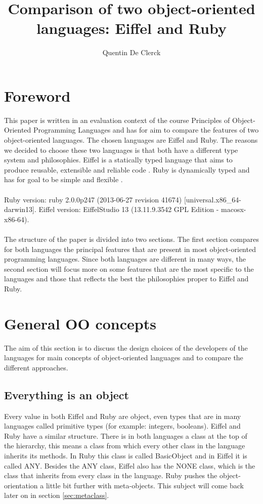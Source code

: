 \documentclass[12pt,a4paper,twocolumn]{article}
\title{Comparison of two object-oriented languages: Eiffel and Ruby}
\author{Quentin De Clerck}
\begin{document}
\maketitle
\tableofcontents
\section{Foreword}
This paper is written in an evaluation context of the course Principles of Object-Oriented Programming Languages and has for aim to compare the features of two object-oriented languages. The chosen languages are Eiffel and Ruby. The reasons we decided to choose these two languages is that both have a different type system and philosophies. Eiffel is a statically typed language that aims to produce reusable, extensible and reliable code \cite{meyer2001eiffel}. Ruby is dynamically typed and has for goal to be simple and flexible \cite{rubyAbout}. 
\\
\\
Ruby version: ruby 2.0.0p247 (2013-06-27 revision 41674) [universal.x86\_64-darwin13].
Eiffel version:  EiffelStudio 13 (13.11.9.3542 GPL Edition - macosx-x86-64).
\\
\\
The structure of the paper is divided into two sections. The first section compares for both languages the principal features that are present in most object-oriented programming languages. Since both languages are different in many ways, the second section will focus more on some features that are the most specific to the languages and those that reflects the best the philosophies proper to Eiffel and Ruby. 
\section{General OO concepts}
The aim of this section is to discuss the design choices of the developers of the languages for main concepts of object-oriented languages and to compare the different approaches. 
\subsection{Everything is an object}
Every value in both Eiffel and Ruby are object, even types that are in many languages called primitive types (for example: integers, booleans). Eiffel and Ruby have a similar structure. There is in both languages a class at the top of the hierarchy, this means a class from which every other class in the language inherits its methods. In Ruby this class is called BasicObject\cite{basicObjectDoc} and in Eiffel it is called ANY\cite{meyer2001eiffel}. Besides the ANY class, Eiffel also has the NONE class, which is the class that inherits from every class in the language. Ruby pushes the object-orientation a little bit further with meta-objects. This subject will come back later on in section \ref{sec:metaclass}.
\end{document}
